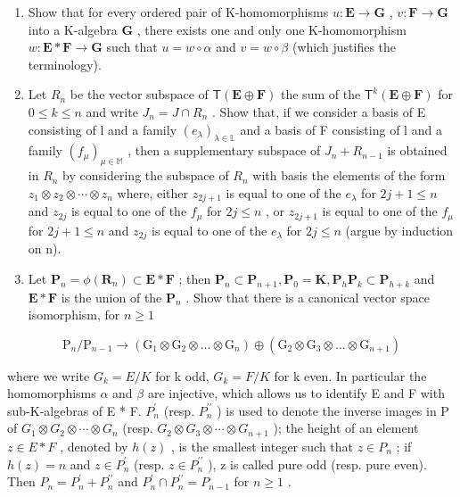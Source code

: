 \begin{enumerate}
\def\labelenumi{(\alph{enumi})}
\item
  Show that for every ordered pair of K-homomorphisms \(u: \mathbf{E} \to \mathbf{G}\) , \(v: \mathbf{F} \to \mathbf{G}\) into a K-algebra \(\mathbf{G}\) , there exists one and only one K-homomorphism \(w: \mathbf{E} * \mathbf{F} \to \mathbf{G}\) such that \(u = w \circ \alpha\) and \(v = w \circ \beta\) (which justifies the terminology).
\item
  Let \(R_{n}\) be the vector subspace of \(\mathsf{T}(\mathbf{E}\oplus\mathbf{F})\) the sum of the \(\mathsf{T}^{k}(\mathbf{E}\oplus\mathbf{F})\) for \(0\leqslant k\leqslant n\) and write \(J_{n}=J\cap R_{n}\) . Show that, if we consider a basis of E consisting of l and a family \((e_{\lambda})_{\lambda\in\mathbb{L}}\) and a basis of F consisting of l and a family \((f_{\mu})_{\mu\in\mathbb{M}}\) , then a supplementary subspace of \(J_{n}+R_{n-1}\) is obtained in \(R_{n}\) by considering the subspace of \(R_{n}\) with basis the elements of the form \(z_{1}\otimes z_{2}\otimes\cdots\otimes z_{n}\) where, either \(z_{2j+1}\) is equal to one of the \(e_{\lambda}\) for \(2j+1\leqslant n\) and \(z_{2j}\) is equal to one of the \(f_{\mu}\) for \(2j\leqslant n\) , or \(z_{2j+1}\) is equal to one of the \(f_{\mu}\) for \(2j+1\leqslant n\) and \(z_{2j}\) is equal to one of the \(e_{\lambda}\) for \(2j\leqslant n\) (argue by induction on n).
\item
  Let \(\mathbf{P}_n = \phi (\mathbf{R}_n)\subset \mathbf{E}*\mathbf{F}\) ; then \(\mathbf{P}_n\subset \mathbf{P}_{n + 1},\mathbf{P}_0 = \mathbf{K},\mathbf{P}_h\mathbf{P}_k\subset \mathbf{P}_{h + k}\) and \(\mathbf{E}*\mathbf{F}\) is the union of the \(\mathbf{P}_n\) . Show that there is a canonical vector space isomorphism, for \(n\geqslant 1\)
\end{enumerate}

\[
\mathrm{P} _ {n} / \mathrm{P} _ {n - 1} \rightarrow \left(\mathrm{G} _ {1} \otimes \mathrm{G} _ {2} \otimes \dots \otimes \mathrm{G} _ {n}\right) \oplus \left(\mathrm{G} _ {2} \otimes \mathrm{G} _ {3} \otimes \dots \otimes \mathrm{G} _ {n + 1}\right)
\]

where we write \(G_{k} = E/K\) for k odd, \(G_{k} = F/K\) for k even. In particular the homomorphisms \(\alpha\) and \(\beta\) are injective, which allows us to identify E and F with sub-K-algebras of E * F. \(P_{n}^{\prime}\) (resp. \(P_{n}^{\prime\prime}\) ) is used to denote the inverse images in P of \(G_{1} \otimes G_{2} \otimes \cdots \otimes G_{n}\) (resp. \(G_{2} \otimes G_{3} \otimes \cdots \otimes G_{n+1}\) ); the height of an element \(z \in E * F\) , denoted by \(h(z)\) , is the smallest integer such that \(z \in P_{n}\) ; if \(h(z) = n\) and \(z \in P_{n}^{\prime}\) (resp. \(z \in P_{n}^{\prime\prime}\) ), z is called pure odd (resp. pure even). Then \(P_{n} = P_{n}^{\prime} + P_{n}^{\prime\prime}\) and \(P_{n}^{\prime} \cap P_{n}^{\prime\prime} = P_{n-1}\) for \(n \geqslant 1\) .

